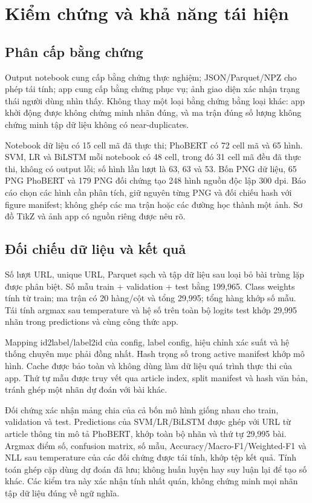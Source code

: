 \chapter{Kiểm chứng và khả năng tái hiện}
\label{chap:verification}
\section{Phân cấp bằng chứng}
Output notebook cung cấp bằng chứng thực nghiệm; JSON/Parquet/NPZ cho phép tái tính; app cung cấp bằng chứng phục vụ; ảnh giao diện xác nhận trạng thái người dùng nhìn thấy. Không thay một loại bằng chứng bằng loại khác: app khởi động được không chứng minh nhãn đúng, và ma trận đúng số lượng không chứng minh tập dữ liệu không có near-duplicates.

Notebook dữ liệu có 15 cell mã đã thực thi; PhoBERT có 72 cell mã và 65 hình. SVM, LR và BiLSTM mỗi notebook có 48 cell, trong đó 31 cell mã đều đã thực thi, không có output lỗi; số hình lần lượt là 63, 63 và 53. Bốn PNG dữ liệu, 65 PNG PhoBERT và 179 PNG đối chứng tạo 248 hình nguồn độc lập 300 dpi. Báo cáo chọn các hình cần phân tích, giữ nguyên từng PNG và đối chiếu hash với figure manifest; không ghép các ma trận hoặc các đường học thành một ảnh. Sơ đồ TikZ và ảnh app có nguồn riêng được nêu rõ.

\section{Đối chiếu dữ liệu và kết quả}
Số lượt URL, unique URL, Parquet sạch và tập dữ liệu sau loại bỏ bài trùng lặp được phân biệt. Số mẫu train + validation + test bằng 199,965. Class weights tính từ train; ma trận có 20 hàng/cột và tổng 29,995; tổng hàng khớp số mẫu. Tái tính argmax sau temperature và hệ số trên toàn bộ logits test khớp 29,995 nhãn trong predictions và cùng công thức app.

Mapping id2label/label2id của config, label config, hiệu chỉnh xác suất và hệ thống chuyên mục phải đồng nhất. Hash trọng số trong active manifest khớp mô hình. Cache được bảo toàn và không dùng làm dữ liệu quá trình thực thi của app. Thứ tự mẫu được truy vết qua article index, split manifest và hash văn bản, tránh ghép một nhãn dự đoán với bài khác.

Đối chứng xác nhận mảng chia của cả bốn mô hình giống nhau cho train, validation và test. Predictions của SVM/LR/BiLSTM được ghép với URL từ article thông tin mô tả PhoBERT, khớp toàn bộ nhãn và thứ tự 29,995 bài. Argmax điểm số, confusion matrix, số mẫu, Accuracy/Macro-F1/Weighted-F1 và NLL sau temperature của các đối chứng được tái tính, khớp tệp kết quả. Tính toán ghép cặp dùng dự đoán đã lưu; không huấn luyện hay suy luận lại để tạo số khác. Các kiểm tra này xác nhận tính nhất quán, không chứng minh mọi nhãn tập dữ liệu đúng về ngữ nghĩa.

